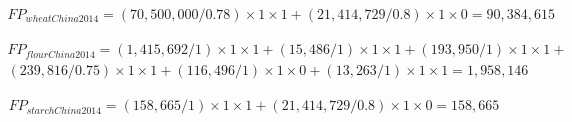 \documentclass[]{article}
\begin{document}
\begin{equation}
\begin{multlined}
\label{eq:wheatFP}
FP_{wheatChina2014} = \left(70,500,000/0.78\right)\times 1\times 1 +\left(21,414,729/0.8\right)\times 1\times 0 = 90,384,615
\end{multlined}
\end{equation}

\begin{equation}
\begin{multlined}
\label{eq:flourFP}
FP_{flourChina2014} = \left(1,415,692/1\right)\times 1\times 1 +\left(15,486/1\right)\times 1\times 1 
+\left(193,950/1\right)\times 1\times 1
+\\
\left(239,816/0.75\right)\times 1\times 1 +
\left(116,496/1\right)\times 1\times 0 +\left(13,263/1\right)\times 1\times 1= 1,958,146
\end{multlined}
\end{equation}

\begin{equation}
\begin{multlined}
\label{eq:starchFP}
FP_{starchChina2014} = \left(158,665/1\right)\times 1\times 1 +\left(21,414,729/0.8\right)\times 1\times 0 = 158,665
\end{multlined}
\end{equation}
\end{document}
